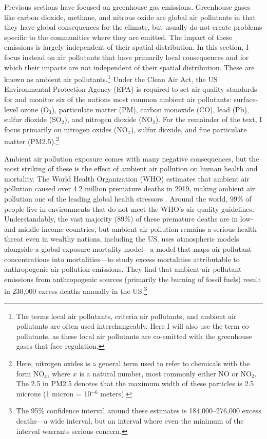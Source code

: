 Previous sections have focused on greenhouse gas emissions. Greenhouse gases like carbon dioxide, methane, and nitrous oxide are global air pollutants in that they have global consequences for the climate, but usually do not create problems specific to the communities where they are emitted. The impact of these emissions is largely independent of their spatial distribution. In this section, I focus instead on air pollutants that have primarily local consequences and for which their impacts are not independent of their spatial distribution. These are known as ambient air pollutants.\footnote{The terms local air pollutants, criteria air pollutants, and ambient air pollutants are often used interchangeably. Here I will also use the term co-pollutants, as these local air pollutants are co-emitted with the greenhouse gases that face regulation.} Under the Clean Air Act, the US Environmental Protection Agency (EPA) is required to set air quality standards for and monitor six of the nations most common ambient air pollutants: surface-level ozone (O$_3$), particulate matter (PM), carbon monoxide (CO), lead (Pb), sulfur dioxide (SO$_2$), and nitrogen dioxide (NO$_2$). For the remainder of the text, I focus primarily on nitrogen oxides (NO$_x$), sulfur dioxide, and fine particulate matter (PM2.5).\footnote{Here, nitrogen oxides is a general term used to refer to chemicals with the form NO$_x$, where $x$ is a natural number, most commonly either NO or NO$_2$. The 2.5 in PM2.5 denotes that the maximum width of these particles is 2.5 microns (1 micron = 10$^{-6}$ meters).}

Ambient air pollution exposure comes with many negative consequences, but the most striking of these is the effect of ambient air pollution on human health and mortality. The World Health Organization (WHO) estimates that ambient air pollution caused over 4.2 million premature deaths in 2019, making ambient air pollution one of the leading global health stressors \citep{who_factsheet}. Around the world, 99\% of people live in environments that do not meet the WHO's air quality guidelines. Understandably, the vast majority (89\%) of these premature deaths are in low- and middle-income countries, but ambient air pollution remains a serious health threat even in wealthy nations, including the US. \cite{lelieveld2019effects} uses atmospheric models alongside a global exposure mortality model---a model that maps air pollutant concentrations into mortalities---to study excess mortalities attributable to anthropogenic air pollution emissions. They find that ambient air pollutant emissions from anthropogenic sources (primarily the burning of fossil fuels) result in 230,000 excess deaths annually in the US.\footnote{
    The 95\% confidence interval around these estimates is 184,000--276,000 excess deaths---a wide interval, but an interval where even the minimum of the interval warrants serious concern.
} 


